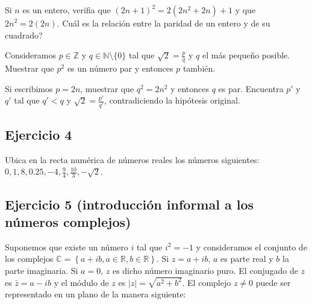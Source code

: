 Si $n$ es un entero, verifia que ${(2n+1)}^2 = 2{(2n^2+2n)} + 1$ y que
${2n}^2 = 2{(2n)}$. Cuál es la relación entre la paridad de un entero y
de su cuadrado?

Consideramos $p \in \mathbb Z$ y $q \in {\mathbb N} \setminus \{0\}$
tal que $\sqrt{2} = \frac{p}{q}$ y $q$ el más pequeño posible.
Muestrar que $p^2$ es un número par y entonces $p$ también.

Si escribimos $p = 2n$, muestrar que $q^2 = 2n^2$ y entonces $q$ es par.
Encuentra $p'$ y $q'$ tal que $q' < q$ y $\sqrt{2} = \frac{p'}{q'}$,
contradiciendo la hipótesis original.

\subsection*{Ejercicio 4}

Ubica en la recta numérica de números reales los números siguientes: $0, 1, 8,
0.25, -4, \frac{9}{4}, \frac{10}{3}, -\sqrt{2}$.

\subsection*{Ejercicio 5 (introducción informal a los números complejos)}

Suponemos que existe un número $i$ tal que $i^2 = -1$ y consideramos el
conjunto de los complejos
$\mathbb{C} = \left\{ a + ib, a \in \mathbb{R}, b \in \mathbb{R} \right\}$.
Si $z = a + ib$, $a$ es parte real y $b$ la parte imaginaria. Si $a = 0$,
$z$ es dicho número imaginario puro.
El conjugado de $z$ es $\bar{z} = a - i b$ y el módulo de $z$ es
${|z|} = \sqrt{a^2 + b^2}$. El complejo $z \neq 0$
puede ser representado en un plano de la manera siguiente:

\begin{center}
\end{center}

